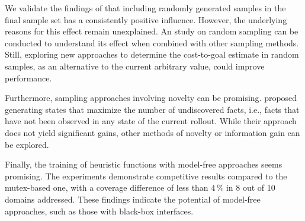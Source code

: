 We validate the findings of \citet{otoole2022sampling} that including randomly generated samples in the final sample set has a consistently positive influence. However, the underlying reasons for this effect remain unexplained. An study on random sampling can be conducted to understand its effect when combined with other sampling methods. Still, exploring new approaches to determine the cost-to-goal estimate in random samples, as an alternative to the current arbitrary value, could improve performance.

Furthermore, sampling approaches involving novelty can be promising. \citet{otoole2022sampling} proposed generating states that maximize the number of undiscovered facts, i.e., facts that have not been observed in any state of the current rollout. While their approach does not yield significant gains, other methods of novelty or information gain can be explored.

Finally, the training of heuristic functions with model-free approaches seems promising. The experiments demonstrate competitive results compared to the mutex-based one, with a coverage difference of less than $4\,\%$ in 8 out of 10 domains addressed. These findings indicate the potential of model-free approaches, such as those with black-box interfaces.
